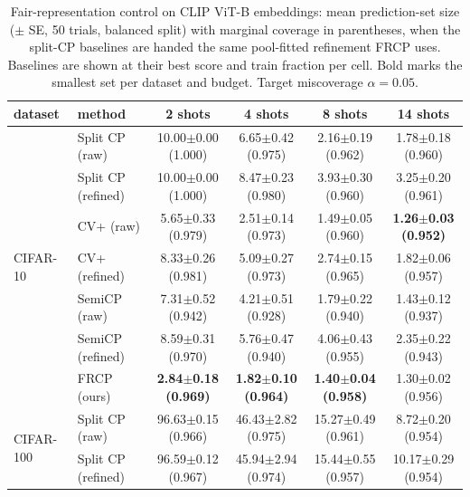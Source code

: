 \begin{table}[t]
\centering
\small
\setlength{\tabcolsep}{4pt}
\caption{Fair-representation control on CLIP ViT-B embeddings: mean prediction-set size ($\pm$ SE, 50 trials, balanced split) with marginal coverage in parentheses, when the split-CP baselines are handed the same pool-fitted refinement FRCP uses. Baselines are shown at their best score and train fraction per cell. Bold marks the smallest set per dataset and budget. Target miscoverage $\alpha=0.05$.}
\label{tab:refined-baselines-clipb-a005}
\begin{tabular}{llcccc}
\toprule
dataset & method & 2 shots & 4 shots & 8 shots & 14 shots\\
\midrule
\multirow{7}{*}{CIFAR-10} & Split CP (raw) & 10.00$\pm$0.00 {\scriptsize(1.000)} & 6.65$\pm$0.42 {\scriptsize(0.975)} & 2.16$\pm$0.19 {\scriptsize(0.962)} & 1.78$\pm$0.18 {\scriptsize(0.960)}\\
 & Split CP (refined) & 10.00$\pm$0.00 {\scriptsize(1.000)} & 8.47$\pm$0.23 {\scriptsize(0.980)} & 3.93$\pm$0.30 {\scriptsize(0.960)} & 3.25$\pm$0.20 {\scriptsize(0.961)}\\
 & CV+ (raw) & 5.65$\pm$0.33 {\scriptsize(0.979)} & 2.51$\pm$0.14 {\scriptsize(0.973)} & 1.49$\pm$0.05 {\scriptsize(0.960)} & \textbf{1.26$\pm$0.03 {\scriptsize(0.952)}}\\
 & CV+ (refined) & 8.33$\pm$0.26 {\scriptsize(0.981)} & 5.09$\pm$0.27 {\scriptsize(0.973)} & 2.74$\pm$0.15 {\scriptsize(0.965)} & 1.82$\pm$0.06 {\scriptsize(0.957)}\\
 & SemiCP (raw) & 7.31$\pm$0.52 {\scriptsize(0.942)} & 4.21$\pm$0.51 {\scriptsize(0.928)} & 1.79$\pm$0.22 {\scriptsize(0.940)} & 1.43$\pm$0.12 {\scriptsize(0.937)}\\
 & SemiCP (refined) & 8.59$\pm$0.31 {\scriptsize(0.970)} & 5.76$\pm$0.47 {\scriptsize(0.940)} & 4.06$\pm$0.43 {\scriptsize(0.955)} & 2.35$\pm$0.22 {\scriptsize(0.943)}\\
 & FRCP (ours) & \textbf{2.84$\pm$0.18 {\scriptsize(0.969)}} & \textbf{1.82$\pm$0.10 {\scriptsize(0.964)}} & \textbf{1.40$\pm$0.04 {\scriptsize(0.958)}} & 1.30$\pm$0.02 {\scriptsize(0.956)}\\
\midrule
\multirow{7}{*}{CIFAR-100} & Split CP (raw) & 96.63$\pm$0.15 {\scriptsize(0.966)} & 46.43$\pm$2.82 {\scriptsize(0.975)} & 15.27$\pm$0.49 {\scriptsize(0.961)} & 8.72$\pm$0.20 {\scriptsize(0.954)}\\
 & Split CP (refined) & 96.59$\pm$0.12 {\scriptsize(0.967)} & 45.94$\pm$2.94 {\scriptsize(0.974)} & 15.44$\pm$0.55 {\scriptsize(0.957)} & 10.17$\pm$0.29 {\scriptsize(0.954)}\\

\end{tabular}
\end{table}
